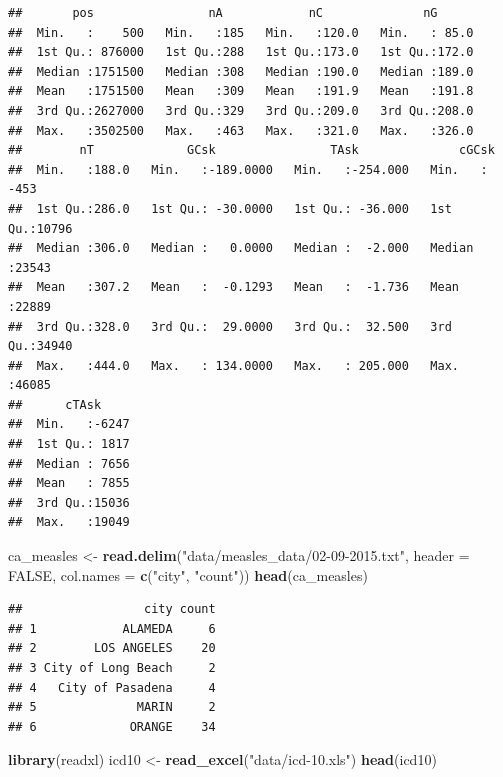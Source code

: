 \documentclass[]{book}
\makeatletter
\newenvironment{Shaded}{\begin{snugshade}}{\end{snugshade}}
\newcommand{\KeywordTok}[1]{\textcolor[rgb]{0.13,0.29,0.53}{\textbf{#1}}}
\newcommand{\DataTypeTok}[1]{\textcolor[rgb]{0.13,0.29,0.53}{#1}}
\newcommand{\StringTok}[1]{\textcolor[rgb]{0.31,0.60,0.02}{#1}}
\newcommand{\OtherTok}[1]{\textcolor[rgb]{0.56,0.35,0.01}{#1}}
\newcommand{\NormalTok}[1]{#1}
\newenvironment{kframe}{%
\medskip{}
\setlength{\fboxsep}{.8em}
 \def\at@end@of@kframe{}%
 \ifinner\ifhmode%
  \def\at@end@of@kframe{\end{minipage}}%
  \begin{minipage}{\columnwidth}%
 \fi\fi%
 \def\FrameCommand##1{\hskip\@totalleftmargin \hskip-\fboxsep
 \colorbox{shadecolor}{##1}\hskip-\fboxsep
     \hskip-\linewidth \hskip-\@totalleftmargin \hskip\columnwidth}%
 \MakeFramed {\advance\hsize-\width
   \@totalleftmargin\z@ \linewidth\hsize
   \@setminipage}}%
 {\par\unskip\endMakeFramed%
 \at@end@of@kframe}
\renewenvironment{Shaded}{\begin{kframe}}{\end{kframe}}
\theoremstyle{definition}
\theoremstyle{definition}
\theoremstyle{definition}
\theoremstyle{remark}
\makeatother
\begin{document}
\begin{verbatim}
##       pos                nA            nC              nG       
##  Min.   :    500   Min.   :185   Min.   :120.0   Min.   : 85.0  
##  1st Qu.: 876000   1st Qu.:288   1st Qu.:173.0   1st Qu.:172.0  
##  Median :1751500   Median :308   Median :190.0   Median :189.0  
##  Mean   :1751500   Mean   :309   Mean   :191.9   Mean   :191.8  
##  3rd Qu.:2627000   3rd Qu.:329   3rd Qu.:209.0   3rd Qu.:208.0  
##  Max.   :3502500   Max.   :463   Max.   :321.0   Max.   :326.0  
##        nT             GCsk                TAsk              cGCsk      
##  Min.   :188.0   Min.   :-189.0000   Min.   :-254.000   Min.   : -453  
##  1st Qu.:286.0   1st Qu.: -30.0000   1st Qu.: -36.000   1st Qu.:10796  
##  Median :306.0   Median :   0.0000   Median :  -2.000   Median :23543  
##  Mean   :307.2   Mean   :  -0.1293   Mean   :  -1.736   Mean   :22889  
##  3rd Qu.:328.0   3rd Qu.:  29.0000   3rd Qu.:  32.500   3rd Qu.:34940  
##  Max.   :444.0   Max.   : 134.0000   Max.   : 205.000   Max.   :46085  
##      cTAsk      
##  Min.   :-6247  
##  1st Qu.: 1817  
##  Median : 7656  
##  Mean   : 7855  
##  3rd Qu.:15036  
##  Max.   :19049
\end{verbatim}

\begin{Shaded}
\begin{Highlighting}[]
\NormalTok{ca_measles <-}\StringTok{ }\KeywordTok{read.delim}\NormalTok{(}\StringTok{"data/measles_data/02-09-2015.txt"}\NormalTok{,}
                         \DataTypeTok{header =} \OtherTok{FALSE}\NormalTok{, }\DataTypeTok{col.names =} \KeywordTok{c}\NormalTok{(}\StringTok{"city"}\NormalTok{, }\StringTok{"count"}\NormalTok{))}
\KeywordTok{head}\NormalTok{(ca_measles)}
\end{Highlighting}
\end{Shaded}

\begin{verbatim}
##                 city count
## 1            ALAMEDA     6
## 2        LOS ANGELES    20
## 3 City of Long Beach     2
## 4   City of Pasadena     4
## 5              MARIN     2
## 6             ORANGE    34
\end{verbatim}

\begin{Shaded}
\begin{Highlighting}[]
\KeywordTok{library}\NormalTok{(readxl)}
\NormalTok{icd10 <-}\StringTok{ }\KeywordTok{read_excel}\NormalTok{(}\StringTok{"data/icd-10.xls"}\NormalTok{)}
\KeywordTok{head}\NormalTok{(icd10)}
\end{Highlighting}
\end{Shaded}
\end{document}
